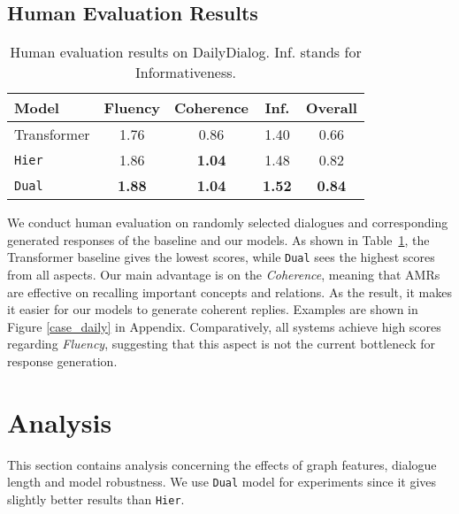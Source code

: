 \documentclass[11pt,a4paper]{article}
\begin{document}
\subsection{Human Evaluation Results}
\begin{table}
	\centering
	\small
	\begin{tabular}{lcccc}
		\toprule
        \textbf{Model} & Fluency & Coherence  & Inf.  & Overall \\
		\midrule 	
		Transformer & 1.76 & 0.86 & 1.40 & 0.66  \\
		\texttt{Hier} & 1.86 & \textbf{1.04} &1.48 & 0.82 \\
		\texttt{Dual} & \textbf{1.88} &\textbf{1.04} & \textbf{1.52}&  \textbf{0.84} \\
\bottomrule
	\end{tabular}
	\caption{Human evaluation results on DailyDialog. Inf. stands for Informativeness.}
	\label{tab:humanondaily}
\end{table}

We conduct human evaluation on randomly selected  dialogues and corresponding generated responses of the baseline and our models.
As shown in Table~\ref{tab:humanondaily}, the Transformer baseline gives the lowest scores, while \texttt{Dual} sees the highest scores from all aspects.
Our main advantage is on the \emph{Coherence}, meaning that AMRs are effective on recalling important concepts and relations.
As the result, it makes it easier for our models to generate coherent replies.
Examples are shown in Figure \ref{case_daily} in Appendix.
Comparatively, all systems achieve high scores regarding \emph{Fluency}, suggesting that this aspect is not the current bottleneck for response generation.






\section{Analysis}
This section contains analysis concerning the effects of graph features, dialogue length and model robustness. 
We use \texttt{Dual} model for experiments since it gives slightly better results than \texttt{Hier}.
\end{document}
